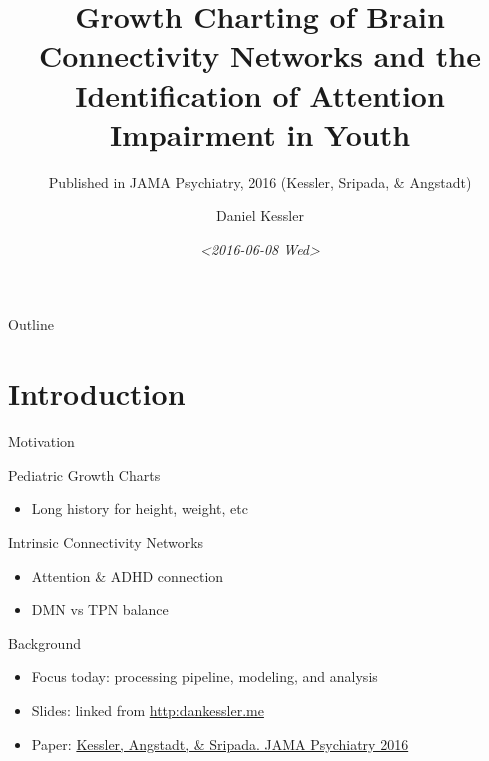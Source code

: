 \documentclass[presentation]{beamer}
\author{Daniel Kessler}
\date{\textit{<2016-06-08 Wed>}}
\title{Growth Charting of Brain Connectivity Networks and the Identification of Attention Impairment in Youth}
\subtitle{Published in JAMA Psychiatry, 2016 (Kessler, Sripada, \& Angstadt)}
\begin{document}
\maketitle
\begin{frame}{Outline}
\tableofcontents
\end{frame}




\section{Introduction}
\label{sec:orgheadline3}
\begin{frame}[label={sec:orgheadline1}]{Motivation}
\begin{block}{Pediatric Growth Charts}
\begin{itemize}
\item Long history for height, weight, etc
\end{itemize}
\end{block}
\begin{block}{Intrinsic Connectivity Networks}
\begin{itemize}
\item Attention \& ADHD connection
\item DMN vs TPN balance
\end{itemize}
\end{block}
\end{frame}
\begin{frame}[label={sec:orgheadline2}]{Background}
\begin{itemize}
\item Focus today: processing pipeline, modeling, and analysis
\item Slides: linked from \url{http:dankessler.me}
\item Paper: \href{http://archpsyc.jamanetwork.com/article.aspx?articleid=2513687}{Kessler, Angstadt, \& Sripada. JAMA Psychiatry 2016}
\end{itemize}
\end{frame}
\end{document}
